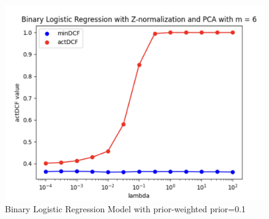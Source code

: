 \documentclass{article}
\begin{document}
\begin{figure}[H]
\begin{minipage}{.27\textwidth}
            \includegraphics[width=\linewidth]{./img/LLR_Z3.png}
        \end{minipage}
        \caption{Binary Logistic Regression Model with prior-weighted prior=0.1} %
        \label{fig:LLR_model_W} %
    \end{figure}
\end{document}
